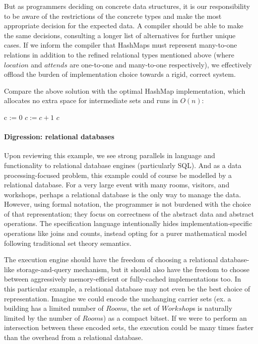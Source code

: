 \documentclass{article}
\begin{document}
But as programmers deciding on concrete data structures, it is our responsibility to be aware of the restrictions of the concrete types and make the most appropriate decision for the expected data. A compiler should be able to make the same decisions, consulting a longer list of alternatives for further unique cases. If we inform the compiler that HashMaps must represent many-to-one relations in addition to the refined relational types mentioned above (where $location$ and $attends$ are one-to-one and many-to-one respectively), we effectively offload the burden of implementation choice towards a rigid, correct system.

Compare the above solution with the optimal HashMap implementation, which allocates no extra space for intermediate sets and runs in $O(n)$:
\begin{algorithmic}
        \State c := 0
                \State $c := c + 1$
            \EndIf
        \EndFor
        \Return $c$
    \EndFunction
\end{algorithmic}

\paragraph{Digression: relational databases} Upon reviewing this example, we see strong parallels in language and functionality to relational database engines (particularly SQL). And as a data processing-focused problem, this example could of course be modelled by a relational database. For a very large event with many rooms, visitors, and workshops, perhaps a relational database is the only way to manage the data. However, using formal notation, the programmer is not burdened with the choice of that representation; they focus on correctness of the abstract data and abstract operations. The specification language intentionally hides implementation-specific operations like joins and counts, instead opting for a purer mathematical model following traditional set theory semantics.

The execution engine should have the freedom of choosing a relational database-like storage-and-query mechanism, but it should also have the freedom to choose between aggressively memory-efficient or fully-cached implementations too. In this particular example, a relational database may not even be the best choice of representation. Imagine we could encode the unchanging carrier sets (ex. a building has a limited number of $Room$s, the set of $Workshop$s is naturally limited by the number of $Room$s) as a compact bitset. If we were to perform an intersection between these encoded sets, the execution could be many times faster than the overhead from a relational database.
\end{document}
